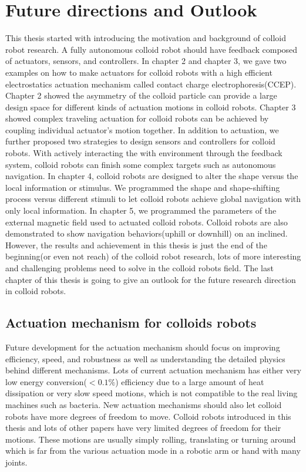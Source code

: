 \chapter{Future directions and Outlook}
This thesis started with introducing the motivation and background of colloid robot research. A fully autonomous colloid robot should have feedback composed of actuators, sensors, and controllers.  In chapter 2 and chapter 3, we gave two examples on how to make actuators for colloid robots with a high efficient electrostatics actuation mechanism called contact charge electrophoresis(CCEP). Chapter 2 showed the asymmetry of the colloid particle can provide a large design space for different kinds of actuation motions in colloid robots.  Chapter 3 showed complex traveling actuation for colloid robots can be achieved by coupling individual actuator's motion together.  In addition to actuation, we further proposed two strategies to design sensors and controllers for colloid robots. With actively interacting the with environment through the feedback system, colloid robots can finish some complex targets such as autonomous navigation. In chapter 4, colloid robots are designed to alter the shape versus the local information or stimulus. We programmed the shape and shape-shifting process versus different stimuli to let colloid robots achieve global navigation with only local information. In chapter 5, we programmed the parameters of the external magnetic field used to actuated colloid robots. Colloid robots are also demonstrated to show navigation behaviors(uphill or downhill) on an inclined. However, the results and achievement in this thesis is just the end of the beginning(or even not reach) of the colloid robot research, lots of more interesting and challenging problems need to solve in the colloid robots field. The last chapter of this thesis is going to give an outlook for the future research direction in colloid robots.
\section{Actuation mechanism for  colloids robots}
Future development for  the actuation mechanism should focus on improving efficiency, speed, and robustness as well as understanding the detailed physics behind different mechanisms. Lots of current actuation mechanism has either very low energy conversion($<0.1\%$) efficiency due to a large amount of heat dissipation or very slow speed motions, which is not compatible to the real living machines such as bacteria. New actuation mechanisms should also let colloid robots have more degrees of freedom to move. Colloid robots introduced in this thesis and lots of other papers have very limited degrees of freedom for their motions. These motions are usually simply rolling, translating or turning around which is far from the various actuation mode in a robotic arm or hand with many joints. 

